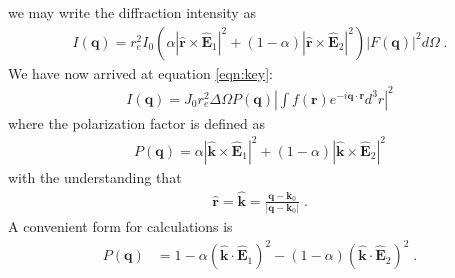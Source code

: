 \documentclass[12pt]{article}
\renewcommand{\vec}[1]{\boldsymbol{#1}}
\newcommand{\hvec}[1]{\hat{\vec{#1}}}
\newcommand{\abs}[1]{\left| #1 \right|}
\begin{document}
we may write the diffraction intensity as
\begin{align}
I(\vec{q}) = r_e^2 I_0 (\alpha | \hvec{r} \times  \hvec{E}_1 |^2 + (1-\alpha) | \hvec{r} \times  \hvec{E}_2 |^2) \left| F(\vec{q}) \right|^2 d\Omega\;.
\end{align}
We have now arrived at equation \ref{eqn:key}:
\begin{align}
    I(\vec{q}) = J_0 r_e^2 \Delta \Omega P(\vec{q})  \abs{\int  f(\vec{r}) e^{-i \vec{q}\cdot\vec{r}} d^3 r }^2
\end{align}
where the polarization factor is defined as
\begin{align}\label{eqn:goodpol}
 P(\vec{q}) = \alpha | \hvec{k} \times  \hvec{E}_1 |^2 + (1-\alpha) | \hvec{k} \times \hvec{E}_2 |^2
\end{align}
with the understanding that 
\begin{align}
 \hvec{r} = \hvec{k} = \frac{\vec{q} - \vec{k}_0}{\abs{\vec{q} - \vec{k}_0}} \;.
\end{align}
A convenient form for calculations is
\begin{align}
 P(\vec{q}) &= 1 - \alpha(\hvec{k} \cdot \hvec{E}_1 )^2 - (1-\alpha)(\hvec{k} \cdot \hvec{E}_2 )^2 \;.
\end{align}


\end{document}
